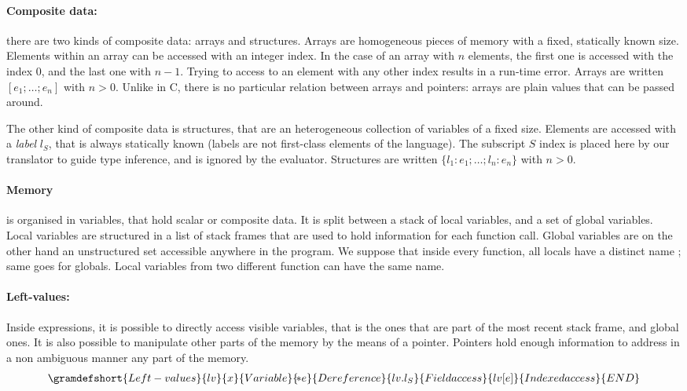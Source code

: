 \paragraph{Composite data:} there are two kinds of composite data: arrays and
structures. Arrays are homogeneous pieces of memory with a fixed, statically
known size. Elements within an array can be accessed with an integer
index.
In the case of an array with $n$ elements,
the first one is accessed with the index $0$,
and the last one with $n-1$.
Trying to access to an element
with any other index results in a run-time error.
Arrays are written $[ e_1; …; e_n ]$ with $n>0$. Unlike in C, there is no
particular relation between arrays and pointers: arrays are plain values that
can be passed around.

The other kind of composite data is structures, that are an heterogeneous
collection of variables of a fixed size. Elements are accessed with a
\emph{label} $l_S$, that is always statically known (labels are not first-class
elements of the language). The subscript $S$ index is placed here by our
translator to guide type inference, and is ignored by the evaluator. Structures
are written $\{ l_1 : e_1 ; … ; l_n : e_n \}$ with $n>0$.

\paragraph{Memory} is organised in variables, that hold scalar or composite
data. It is split between a stack of local variables, and a set of global
variables. Local variables are structured in a list of stack frames that are
used to hold information for each function call. Global variables are on the
other hand an unstructured set accessible anywhere in the program. We suppose
that inside every function, all locals have a distinct name ; same goes for
globals. Local variables from two different function can have the same name.

\paragraph{Left-values:} Inside expressions, it is possible to directly access
visible variables, that is the ones that are part of the most recent stack
frame, and global ones. It is also possible to manipulate other parts of the
memory by the means of a pointer. Pointers hold enough information
to address in a non ambiguous manner any part of the memory.%
{\small \begin{align*}
  \gramdefshort{Left-values}{lv}
                  { x      }{ Variable }
                  { \hspace{-2pt}*e    }{ Dereference }
                  { lv.l_S }{ Field access }
                  { lv[e]  }{ Indexed access }
                  {END}
\end{align*}}%
